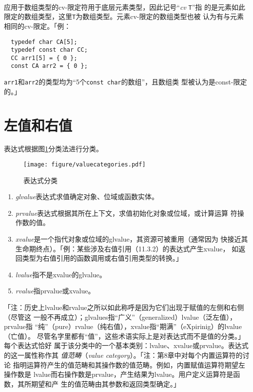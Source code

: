 \paragraph{}
应用于数组类型的cv-限定符用于底层元素类型，因此记号``\textit{cv} \texttt{T}''指
的是元素如此限定的数组类型，这里\texttt{T}为数组类型。元素cv-限定的数组类型也被
认为有与元素相同的cv-限定。「例：
\begin{lstlisting}
  typedef char CA[5];
  typedef const char CC;
  CC arr1[5] = { 0 };
  const CA arr2 = { 0 };
\end{lstlisting}
\texttt{arr1}和\texttt{arr2}的类型均为``5个\texttt{const char}的数组''，且数组类
型被认为是const-限定的。」

\section{左值和右值}
\paragraph{}
表达式根据图\ref{fig:valuecat}分类法进行分类。

\begin{figure}[htpb]
  \centering
  \texttt{[image: figure/valuecategories.pdf]}
  \caption{表达式分类}
  \label{fig:valuecat}
\end{figure}

\begin{enumerate}
  \item{\textit{glvalue}表达式求值确定对象、位域或函数实体。}
  \item{\textit{prvalue}表达式根据其所在上下文，求值初始化对象或位域，或计算运算
      符操作数的值。}
    \item{\textit{xvalue}是一个指代对象或位域的glvalue，其资源可被重用（通常因为
      快接近其生命期终点）。「例：某些涉及右值引用（11.3.2）的表达式产生xvalue，
      如返回类型为右值引用的函数调用或右值引用类型的转换。」}
    \item{\textit{lvalue}指不是xvalue的glvalue。}
    \item{\textit{rvalue}指prvalue或xvalue。}
\end{enumerate}
「注：历史上lvalue和rvalue之所以如此称呼是因为它们出现于赋值的左侧和右侧（尽管这
一般不再成立）；glvalues指``广义''（generalized）lvalue（泛左值），prvalue指
``纯''（pure）rvalue（纯右值），xvalue指``期满''（eXpirinig）的lvalue（亡值）。
尽管名字里都有``值''，这些术语实际上是对表达式而不是值的分类。」每个表达式恰好
属于该分类中的一个基本类别：lvalue、xvalue或prvalue。表达式的这一属性称作其
\textit{值范畴}（\textit{value category}）。「注：第8章中对每个内置运算符的讨论
指明运算符产生的值范畴和其操作数的值范畴。例如，内置赋值运算符期望左操作数是
lvalue而右操作数是prvalue，产生结果为lvalue。用户定义运算符是函数，其所期望和产
生的值范畴由其参数和返回类型确定。」

